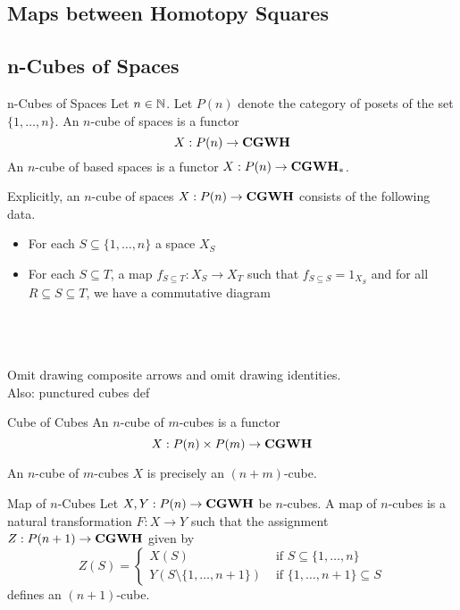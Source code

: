 \documentclass[a4paper]{article}
\begin{document}
\subsection{Maps between Homotopy Squares}

\subsection{n-Cubes of Spaces}
\begin{defn}{n-Cubes of Spaces}{} Let $n\in\mathbb{N}$. Let $P(n)$ denote the category of posets of the set $\{1,\dots,n\}$. An $n$-cube of spaces is a functor $$X:P(n)\to\bold{CGWH}$$ An $n$-cube of based spaces is a functor $X:P(n)\to\bold{CGWH}_\ast$. 
\end{defn}

Explicitly, an $n$-cube of spaces $X:P(n)\to\bold{CGWH}$ consists of the following data. 
\begin{itemize}
\item For each $S\subseteq\{1,\dots,n\}$ a space $X_S$
\item For each $S\subseteq T$, a map $f_{S\subseteq T}:X_S\to X_T$ such that $f_{S\subseteq S}=1_{X_S}$ and for all $R\subseteq S\subseteq T$, we have a commutative diagram \\~\\
\\~\\
\end{itemize}

Omit drawing composite arrows and omit drawing identities. \\
Also: punctured cubes def

\begin{defn}{Cube of Cubes}{} An $n$-cube of $m$-cubes is a functor $$X:P(n)\times P(m)\to\bold{CGWH}$$
\end{defn}

\begin{lmm}{}{} An $n$-cube of $m$-cubes $X$ is precisely an $(n+m)$-cube. 
\end{lmm}

\begin{defn}{Map of $n$-Cubes}{} Let $X,Y:P(n)\to\bold{CGWH}$ be $n$-cubes. A map of $n$-cubes is a natural transformation $F:X\to Y$ such that the assignment $Z:P(n+1)\to\bold{CGWH}$ given by $$Z(S)=\begin{cases}
X(S) & \text{ if } S\subseteq\{1,\dots,n\}\\
Y(S\setminus\{1,\dots, n+1\}) & \text{ if }\{1,\dots,n+1\}\subseteq S
\end{cases}$$
defines an $(n+1)$-cube. 
\end{defn}
\end{document}
